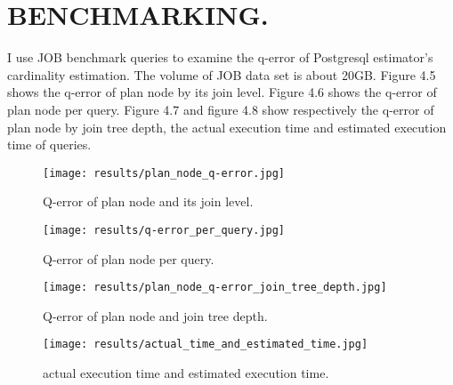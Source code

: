\section{BENCHMARKING.}
{\justify
I use JOB benchmark queries to examine the q-error of Postgresql estimator's cardinality estimation. The volume of JOB data set is about 20GB. Figure 4.5 shows the q-error of plan node by its join level. Figure 4.6 shows the q-error of plan node per query. Figure 4.7 and figure 4.8 show respectively the q-error of plan node by join tree depth, the actual execution time and estimated execution time of queries.
\par }
{
\begin{figure}[H]
\centering
\texttt{[image: results/plan\_node\_q-error.jpg]}
\caption{Q-error of plan node and its join level.}
\end{figure}
}
{
\begin{figure}[H]
\centering
\texttt{[image: results/q-error\_per\_query.jpg]}
\caption{Q-error of plan node per query.}
\end{figure}
}
{
\begin{figure}[H]
\centering
\texttt{[image: results/plan\_node\_q-error\_join\_tree\_depth.jpg]}
\caption{Q-error of plan node and join tree depth.}
\end{figure}
}
{
\begin{figure}[H]
\centering
\texttt{[image: results/actual\_time\_and\_estimated\_time.jpg]}
\caption{actual execution time and estimated execution time.}
\end{figure}
}
